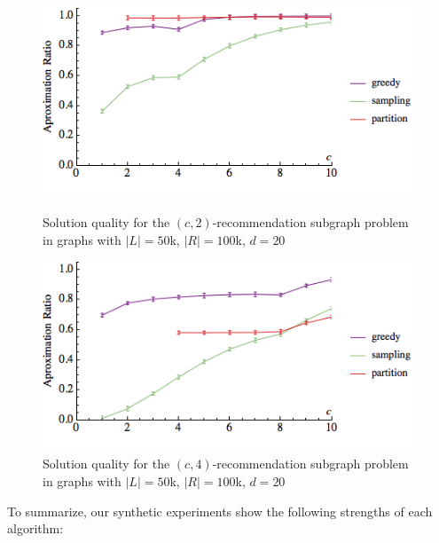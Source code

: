 \begin{figure}
\centering
\begin{minipage}[h]{0.48\textwidth}
\centering
\includegraphics[width=0.99\textwidth]{images/l=50000,r=100000,a=2_Greedy_vs_Naive_error.png}
\vspace{-1cm}
\caption{Solution quality for the $(c, 2)$-recommendation subgraph problem in graphs with $|L|=50$k, $|R|=100$k, $d=20$}\label{fig:a=2}
\end{minipage}
\vspace{.2cm}
\hspace{0cm}
\begin{minipage}[h]{0.48\textwidth}
\centering
\includegraphics[width=0.99\textwidth]{images/l=50000,r=100000,a=4_Greedy_vs_Naive_error.png}
\vspace{-1cm}
\caption{Solution quality for the $(c, 4)$-recommendation subgraph problem in graphs with $|L|=50$k, $|R|=100$k, $d=20$}\label{fig:a=4}
\end{minipage}
\vspace{-.8cm}
\end{figure}

To summarize, our synthetic experiments show the following strengths of each algorithm: \vs

